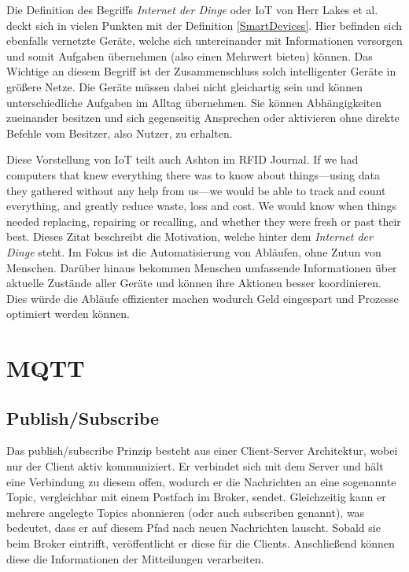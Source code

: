         Die Definition des Begriffs \emph{Internet der Dinge} oder \ac{IoT} von Herr Lakes et al. deckt sich in vielen Punkten mit der Definition \ref{SmartDevices}. Hier befinden sich ebenfalls vernetzte Geräte, welche sich untereinander mit Informationen versorgen und somit Aufgaben übernehmen (also einen Mehrwert bieten) können. Das Wichtige an diesem Begriff ist der Zusammenschluss solch intelligenter Geräte in größere Netze. Die Geräte müssen dabei nicht gleichartig sein und können unterschiedliche Aufgaben im Alltag übernehmen. Sie können Abhängigkeiten zueinander besitzen und sich gegenseitig Ansprechen oder aktivieren ohne direkte Befehle vom Besitzer, also Nutzer, zu erhalten.
        
        Diese Vorstellung von \ac{IoT} teilt auch Ashton im RFID Journal.
        \grqq If we had computers that knew everything there was to know about things—using data they gathered without any help from us—we would be able to track and count everything, and greatly reduce waste, loss and cost. We would know when things needed replacing, repairing or recalling, and whether they were fresh or past their best.\glqq{} \cite{ashton2009internet}
        Dieses Zitat beschreibt die Motivation, welche hinter dem \emph{Internet der Dinge} steht.
        Im Fokus ist die Automatisierung von Abläufen, ohne Zutun von Menschen. Darüber hinaus bekommen Menschen umfassende Informationen über aktuelle Zustände aller Geräte und können ihre Aktionen besser koordinieren. Dies würde die Abläufe effizienter machen wodurch Geld eingespart und Prozesse optimiert werden können.

\section{MQTT}
    \subsection{Publish/Subscribe}
    Das publish/subscribe Prinzip besteht aus einer Client-Server Architektur, wobei nur der Client aktiv kommuniziert. Er verbindet sich mit dem Server und hält eine Verbindung zu diesem offen, wodurch er die Nachrichten an eine sogenannte Topic, vergleichbar mit einem Postfach im Broker, sendet. Gleichzeitig kann er mehrere angelegte Topics abonnieren (oder auch subscriben genannt), was bedeutet, dass er auf diesem Pfad nach neuen Nachrichten lauscht. Sobald sie beim Broker eintrifft, veröffentlicht er diese für die Clients. Anschließend können diese die Informationen der Mitteilungen verarbeiten.

